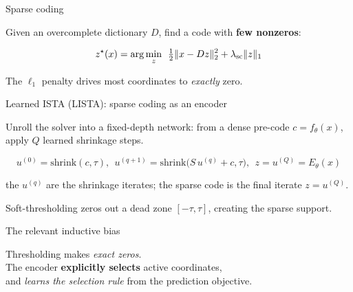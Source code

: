 \documentclass[aspectratio=169,10pt]{beamer}
\newcommand{\emphp}[1]{{\color{skaepurple}\bfseries #1}}
\newcommand{\statement}[1]{\vfill\begin{center}\Large\color{skaeink}#1\end{center}\vfill}
\newcommand{\figcap}[1]{\vspace{-0.35em}\par{\small\color{skaegray}\centering #1\par}}
\begin{document}
\begin{frame}{Sparse coding}
  \begin{center}
  Given an overcomplete dictionary $D$, find a code with \emphp{few nonzeros}:
  \end{center}
  \vspace{0.5em}
  \[
    \Large z^\star(x)=\arg\min_{z}\ \tfrac12\|x-Dz\|_2^2+\lambda_{\mathrm{sc}}\|z\|_1
  \]
  \vspace{0.6em}
  \begin{center}\large\color{skaegray}
  The $\ell_1$ penalty drives most coordinates to \emph{exactly} zero.
  \end{center}
\end{frame}

\begin{frame}{Learned ISTA (LISTA): sparse coding as an encoder}
  \begin{center}\normalsize
  Unroll the solver into a fixed-depth network: from a dense pre-code $c=f_\theta(x)$, apply $Q$ learned shrinkage steps.
  \end{center}
  \vspace{0.2em}
  \[
    u^{(0)}=\mathrm{shrink}(c,\tau),\ \ u^{(q+1)}=\mathrm{shrink}\!\big(S\,u^{(q)}+c,\tau\big),\ \ z=u^{(Q)}=E_\theta(x)
  \]
  \begin{center}\footnotesize\color{skaegray}
  the $u^{(q)}$ are the shrinkage iterates; the sparse code is the final iterate $z=u^{(Q)}$.
  \end{center}
  \begin{center}
  \end{center}
  \figcap{Soft-thresholding zeros out a dead zone $[-\tau,\tau]$, creating the sparse support.}
\end{frame}

\begin{frame}{The relevant inductive bias}
  \statement{Thresholding makes \emph{exact zeros}.\\[0.6em]
  The encoder \emphp{explicitly selects} active coordinates,\\ and \emph{learns the selection rule} from the prediction objective.}
\end{frame}
\end{document}
